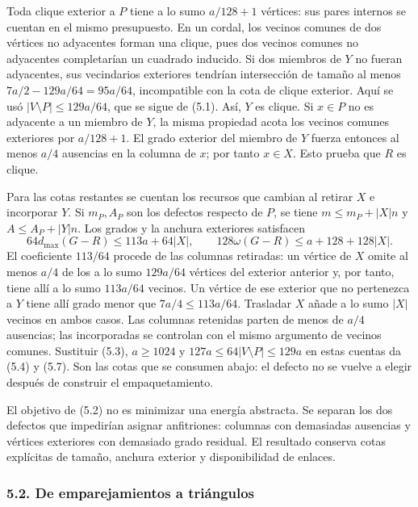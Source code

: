 \documentclass[spanish,11pt,a4paper]{article}
\begin{document}
Toda clique exterior a \(P\) tiene a lo sumo \(a/128+1\) vértices: sus pares internos se cuentan en el mismo presupuesto. En un cordal, los vecinos comunes de dos vértices no adyacentes forman una clique, pues dos vecinos comunes no adyacentes completarían un cuadrado inducido. Si dos miembros de \(Y\) no fueran adyacentes, sus vecindarios exteriores tendrían intersección de tamaño al menos \(7a/2-129a/64=95a/64\), incompatible con la cota de clique exterior. Aquí se usó \(|V\setminus P|\le129a/64\), que se sigue de (5.1). Así, \(Y\) es clique. Si \(x\in P\) no es adyacente a un miembro de \(Y\), la misma propiedad acota los vecinos comunes exteriores por \(a/128+1\). El grado exterior del miembro de \(Y\) fuerza entonces al menos \(a/4\) ausencias en la columna de \(x\); por tanto \(x\in X\). Esto prueba que \(R\) es clique.

Para las cotas restantes se cuentan los recursos que cambian al retirar \(X\) e incorporar \(Y\). Si \(m_P,A_P\) son los defectos respecto de \(P\), se tiene \(m\le m_P+|X|n\) y \(A\le A_P+|Y|n\). Los grados y la anchura exteriores satisfacen \[
64d_{\max}(G-R)\le113a+64|X|,\qquad
128\omega(G-R)\le a+128+128|X|.
\] El coeficiente \(113/64\) procede de las columnas retiradas: un vértice de \(X\) omite al menos \(a/4\) de los a lo sumo \(129a/64\) vértices del exterior anterior y, por tanto, tiene allí a lo sumo \(113a/64\) vecinos. Un vértice de ese exterior que no pertenezca a \(Y\) tiene allí grado menor que \(7a/4\le113a/64\). Trasladar \(X\) añade a lo sumo \(|X|\) vecinos en ambos casos. Las columnas retenidas parten de menos de \(a/4\) ausencias; las incorporadas se controlan con el mismo argumento de vecinos comunes. Sustituir (5.3), \(a\ge1024\) y \(127a\le64|V\setminus P|\le129a\) en estas cuentas da (5.4) y (5.7). Son las cotas que se consumen abajo: el defecto no se vuelve a elegir después de construir el empaquetamiento.

El objetivo de (5.2) no es minimizar una energía abstracta. Se separan los dos defectos que impedirían asignar anfitriones: columnas con demasiadas ausencias y vértices exteriores con demasiado grado residual. El resultado conserva cotas explícitas de tamaño, anchura exterior y disponibilidad de enlaces.

\subsubsection{5.2. De emparejamientos a triángulos}\label{de-emparejamientos-a-triangulos}
\end{document}
